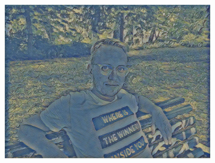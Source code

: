 \begin{figure}[H]
\begin{subfigure}[h]{0.32\textwidth}
        \includegraphics[width=\textwidth]{resources/content/experiments/ich-vgg16_the_olive_trees.jpg}
    \end{subfigure}


\end{figure}
